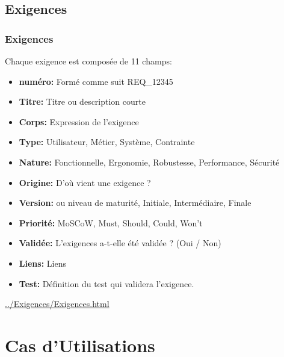 \documentclass{beamer}
\begin{document}
\subsection{Exigences}
\begin{frame}
 \frametitle{Exigences}
Chaque exigence est composée de 11 champs:
\begin{itemize}
\item \textbf{numéro:} Formé comme suit REQ\_12345
\item \textbf{Titre:} Titre ou description courte
\item \textbf{Corps:} Expression de l'exigence
\item \textbf{Type:} Utilisateur, Métier, Système, Contrainte
\item \textbf{Nature:} Fonctionnelle, Ergonomie, Robustesse, Performance, Sécurité
\item \textbf{Origine:} D'où vient une exigence ?
\item \textbf{Version:} ou niveau de maturité, Initiale, Intermédiaire, Finale
\item \textbf{Priorité:} MoSCoW, Must, Should, Could, Won't
\item \textbf{Validée:} L'exigences a-t-elle été validée ? (Oui / Non)
\item \textbf{Liens:} Liens
\item \textbf{Test:} Définition du test qui validera l'exigence.
\end{itemize}

\url{../Exigences/Exigences.html}
\end{frame}

\section{Cas d'Utilisations}
\end{document}
